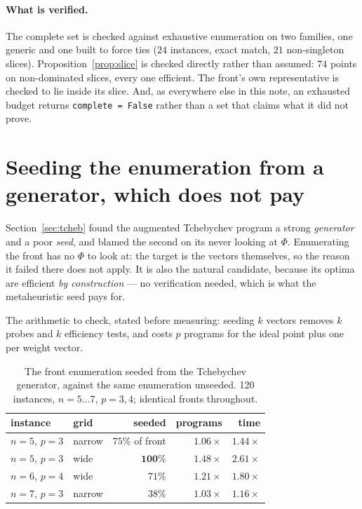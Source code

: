 \documentclass[11pt,a4paper]{article}
\begin{document}
\paragraph{What is verified.}  The complete set is checked against exhaustive
enumeration on two families, one generic and one built to force ties
($24$ instances, exact match, $21$ non-singleton slices).
Proposition~\ref{prop:slice} is checked directly rather than assumed: $74$
points on non-dominated slices, every one efficient.  The front's own
representative is checked to lie inside its slice.  And, as everywhere else in
this note, an exhausted budget returns \texttt{complete = False} rather than a
set that claims what it did not prove.

\section{Seeding the enumeration from a generator, which does not pay}
\label{sec:gen}

Section~\ref{sec:tcheb} found the augmented Tchebychev program a strong
\emph{generator} and a poor \emph{seed}, and blamed the second on its never
looking at $\Phi$.  Enumerating the front has no $\Phi$ to look at: the target
is the vectors themselves, so the reason it failed there does not apply.  It is
also the natural candidate, because its optima are efficient \emph{by
construction} --- no verification needed, which is what the metaheuristic seed
pays for.

The arithmetic to check, stated before measuring: seeding $k$ vectors removes
$k$ probes and $k$ efficiency tests, and costs $p$ programs for the ideal point
plus one per weight vector.

\begin{table}[h]
\centering
\caption{The front enumeration seeded from the Tchebychev generator, against
the same enumeration unseeded.  120 instances, $n = 5 \dots 7$, $p = 3, 4$;
identical fronts throughout.}
\begin{tabular}{llrrr}
\toprule
instance & grid & seeded & programs & time \\
\midrule
$n=5$, $p=3$ & narrow & $75\%$ of front  & $1.06\times$ & $1.44\times$ \\
$n=5$, $p=3$ & wide   & $\mathbf{100\%}$ & $1.48\times$ & $\mathbf{2.61\times}$ \\
$n=6$, $p=4$ & wide   & $71\%$           & $1.21\times$ & $1.80\times$ \\
$n=7$, $p=3$ & narrow & $38\%$           & $1.03\times$ & $1.16\times$ \\
\bottomrule
\end{tabular}
\end{table}
\end{document}
